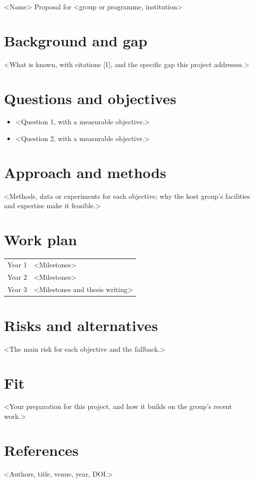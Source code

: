 \documentclass[10pt]{article}
\begin{document}
\begin{center}
  {\Large\bfseries <Proposal title>\par}
  \vspace{6pt}
  {\small <Name> \enspace\textbullet\enspace Proposal for <group or programme, institution> \enspace\textbullet{}\par}
\end{center}

\section{Background and gap}
<What is known, with citations [1], and the specific gap this project addresses.>

\section{Questions and objectives}
\begin{itemize}
  \item <Question 1, with a measurable objective.>
  \item <Question 2, with a measurable objective.>
\end{itemize}

\section{Approach and methods}
<Methods, data or experiments for each objective; why the host group's facilities and expertise make it feasible.>

\section{Work plan}
\begin{tabular}{@{}p{}p{}@{}}
  Year 1 & <Milestones> \\
  Year 2 & <Milestones> \\
  Year 3 & <Milestones and thesis writing> \\
\end{tabular}

\section{Risks and alternatives}
<The main risk for each objective and the fallback.>

\section{Fit}
<Your preparation for this project, and how it builds on the group's recent work.>

\section*{References}
\begin{enumerate}[label={[\arabic*]}, leftmargin=20pt, itemsep=1pt]
  \item <Authors, title, venue, year, DOI.>
\end{enumerate}
\end{document}
